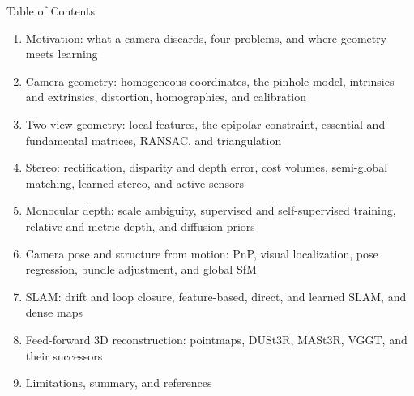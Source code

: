 \begin{frame}{Table of Contents}
  \begin{enumerate}\itemsep0.15em\footnotesize
    \item Motivation: what a camera discards, four problems, and where geometry meets learning
    \item Camera geometry: homogeneous coordinates, the pinhole model, intrinsics and extrinsics, distortion, homographies, and calibration
    \item Two-view geometry: local features, the epipolar constraint, essential and fundamental matrices, RANSAC, and triangulation
    \item Stereo: rectification, disparity and depth error, cost volumes, semi-global matching, learned stereo, and active sensors
    \item Monocular depth: scale ambiguity, supervised and self-supervised training, relative and metric depth, and diffusion priors
    \item Camera pose and structure from motion: PnP, visual localization, pose regression, bundle adjustment, and global SfM
    \item SLAM: drift and loop closure, feature-based, direct, and learned SLAM, and dense maps
    \item Feed-forward 3D reconstruction: pointmaps, DUSt3R, MASt3R, VGGT, and their successors
    \item Limitations, summary, and references
  \end{enumerate}
\end{frame}
